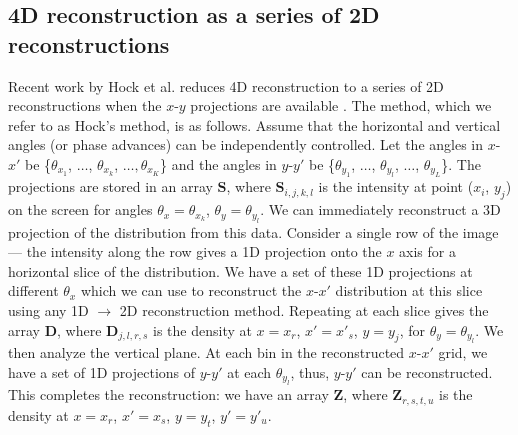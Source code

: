 \subsection{4D reconstruction as a series of 2D reconstructions}

Recent work by Hock et al. reduces 4D reconstruction to a series of 2D reconstructions when the $x$-$y$ projections are available \cite{Hock2013a}. The method, which we refer to as Hock's method, is as follows. Assume that the horizontal and vertical angles (or phase advances) can be independently controlled. Let the angles in $x$-$x'$ be \{$\theta_{x_1}$, $\dots$, $\theta_{x_k}$, $\dots, \theta_{x_K}$\} and the angles in $y$-$y'$ be \{$\theta_{y_1}$, $\dots$, $\theta_{y_l}$, $\dots$, $\theta_{y_L}$\}. The projections are stored in an array $\mathbf{S}$, where $\mathbf{S}_{i,j,k,l}$ is the intensity at point ($x_i$, $y_j$) on the screen for angles $\theta_x = \theta_{x_k}$, $\theta_y = \theta_{y_l}$. We can immediately reconstruct a 3D projection of the distribution from this data. Consider a single row of the image — the intensity along the row gives a 1D projection onto the $x$ axis for a horizontal slice of the distribution. We have a set of these 1D projections at different $\theta_{x}$ which we can use to reconstruct the $x$-$x'$ distribution at this slice using any 1D $\rightarrow$ 2D reconstruction method. Repeating at each slice gives the array $\mathbf{D}$, where $\mathbf{D}_{j, l, r, s}$ is the density at $x = x_r$, $x' = x'_s$, $y = y_j$, for $\theta_{y} = \theta_{y_l}$. We then analyze the vertical plane. At each bin in the reconstructed $x$-$x'$ grid, we have a set of 1D projections of $y$-$y'$ at each $\theta_{y_l}$, thus, $y$-$y'$ can be reconstructed. This completes the reconstruction: we have an array $\mathbf{Z}$, where $\mathbf{Z}_{r, s, t, u}$ is the density at $x = x_r$, $x' = x_s$, $y = y_t$, $y' = y'_u$.

